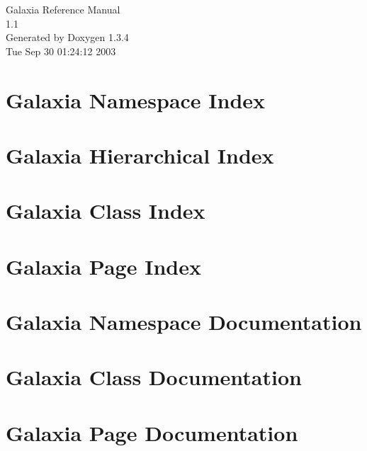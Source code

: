 \documentclass[a4paper]{book}
\begin{document}
\begin{titlepage}
\vspace*{7cm}
\begin{center}
{\Large Galaxia Reference Manual\\[1ex]\large 1.1 }\\
\vspace*{1cm}
{\large Generated by Doxygen 1.3.4}\\
\vspace*{0.5cm}
{\small Tue Sep 30 01:24:12 2003}\\
\end{center}
\end{titlepage}
\clearemptydoublepage
{}
\tableofcontents
\clearemptydoublepage
{}
\chapter{Galaxia Namespace Index}

\chapter{Galaxia Hierarchical Index}

\chapter{Galaxia Class Index}

\chapter{Galaxia Page Index}

\chapter{Galaxia Namespace Documentation}

\chapter{Galaxia Class Documentation}























\chapter{Galaxia Page Documentation}

\printindex
\end{document}
